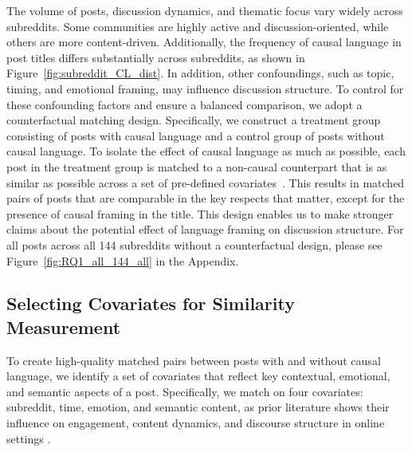 \documentclass[acmsmall]{acmart}
\begin{document}
The volume of posts, discussion dynamics, and thematic focus vary widely across subreddits. Some communities are highly active and discussion-oriented, while others are more content-driven. Additionally, the frequency of causal language in post titles differs substantially across subreddits, as shown in Figure~\ref{fig:subreddit_CL_dist}. In addition, other confoundings, such as topic, timing, and emotional framing, may influence discussion structure. To control for these confounding factors and ensure a balanced comparison, we adopt a counterfactual matching design. Specifically, we construct a treatment group consisting of posts with causal language and a control group of posts without causal language. To isolate the effect of causal language as much as possible, each post in the treatment group is matched to a non-causal counterpart that is as similar as possible across a set of pre-defined covariates~\cite{stuart2010matching}. This results in matched pairs of posts that are comparable in the key respects that matter,  except for the presence of causal framing in the title. This design enables us to make stronger claims about the potential effect of language framing on discussion structure. For all posts across all 144 subreddits without a counterfactual design, please see Figure~\ref{fig:RQ1_all_144_all} in the Appendix.






\subsection{Selecting Covariates for Similarity Measurement}

To create high-quality matched pairs between posts with and without causal language, we identify a set of covariates that reflect key contextual, emotional, and semantic aspects of a post. Specifically, we match on four covariates: subreddit, time, emotion, and semantic content, as prior literature shows their influence on engagement, content dynamics, and discourse structure in online settings \cite{brady2017emotion, stieglitz2013emotions, krohn2022subreddit, oddny2023impact, razis2020modeling}.
\end{document}
